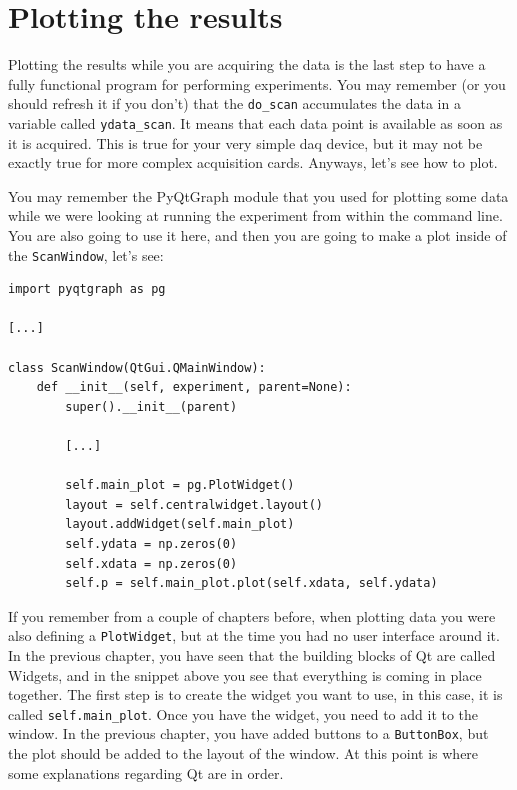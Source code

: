 \section{Plotting the results}\label{plotting-theresults}
Plotting the results while you are acquiring the data is the last step
to have a fully functional program for performing experiments. You may
remember (or you should refresh it if you don't) that the
\texttt{do_scan} accumulates the data in a variable called
\texttt{ydata_scan}. It means that each data point is available as soon
as it is acquired. This is true for your very simple daq device, but it
may not be exactly true for more complex acquisition cards. Anyways,
let's see how to plot.

You may remember the PyQtGraph module that you used for plotting some
data while we were looking at running the experiment from within the
command line. You are also going to use it here, and then you are going
to make a plot inside of the \texttt{ScanWindow}, let's see:

\begin{verbatim}
import pyqtgraph as pg

[...]

class ScanWindow(QtGui.QMainWindow):
    def __init__(self, experiment, parent=None):
        super().__init__(parent)

        [...]

        self.main_plot = pg.PlotWidget()
        layout = self.centralwidget.layout()
        layout.addWidget(self.main_plot)
        self.ydata = np.zeros(0)
        self.xdata = np.zeros(0)
        self.p = self.main_plot.plot(self.xdata, self.ydata)
\end{verbatim}

If you remember from a couple of chapters before, when plotting data you
were also defining a \texttt{PlotWidget}, but at the time you had no
user interface around it. In the previous chapter, you have seen that
the building blocks of Qt are called Widgets, and in the snippet above
you see that everything is coming in place together. The first step is
to create the widget you want to use, in this case, it is called
\texttt{self.main_plot}. Once you have the widget, you need to add it
to the window. In the previous chapter, you have added buttons to a
\texttt{ButtonBox}, but the plot should be added to the layout of the
window. At this point is where some explanations regarding Qt are
in order.

